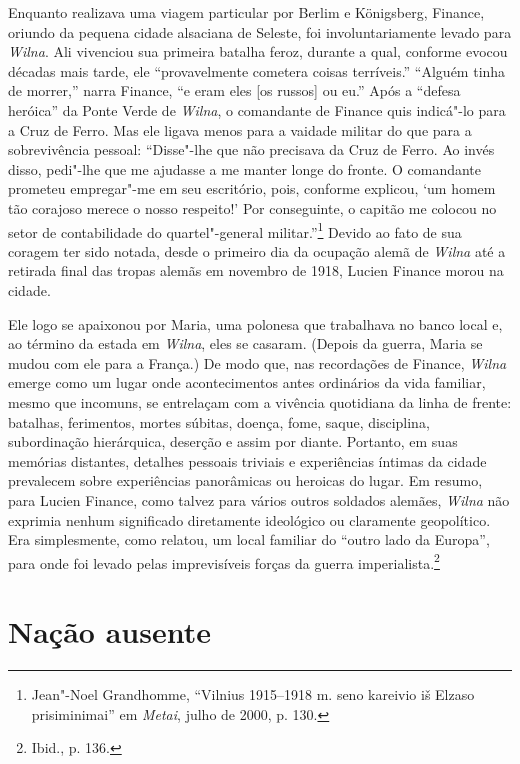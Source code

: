 Enquanto realizava uma viagem particular por Berlim e Königsberg,
Finance, oriundo da pequena cidade alsaciana de Seleste, foi
involuntariamente levado para \textit{Wilna}. Ali vivenciou sua primeira batalha
feroz, durante a qual, conforme evocou décadas mais tarde, ele
``provavelmente cometera coisas terríveis.'' ``Alguém tinha de morrer,''
narra Finance, ``e eram eles {[}os russos{]} ou eu.'' Após a ``defesa
heróica'' da Ponte Verde de \textit{Wilna}, o comandante de Finance quis
indicá"-lo para a Cruz de Ferro. Mas ele ligava menos para a vaidade
militar do que para a sobrevivência pessoal: ``Disse"-lhe que não
precisava da Cruz de Ferro. Ao invés disso, pedi"-lhe que me ajudasse a
me manter longe do fronte. O comandante prometeu empregar"-me em seu
escritório, pois, conforme explicou, `um homem tão corajoso merece o
nosso respeito!' Por conseguinte, o capitão me colocou no setor de
contabilidade do quartel"-general militar.''\footnote{Jean"-Noel Grandhomme, ``Vilnius 1915--1918 m. seno kareivio iš Elzaso prisiminimai'' em \textit{Metai}, julho de 2000, p. 130.} Devido ao fato de sua coragem ter sido notada, desde o primeiro dia da ocupação alemã
de \textit{Wilna} até a retirada final das tropas alemãs em novembro de 1918,
Lucien Finance morou na cidade.

Ele logo se apaixonou por Maria, uma polonesa que trabalhava no banco
local e, ao término da estada em \textit{Wilna}, eles se casaram. (Depois da
guerra, Maria se mudou com ele para a França.) De modo que, nas
recordações de Finance, \textit{Wilna} emerge como um lugar onde acontecimentos
antes ordinários da vida familiar, mesmo que incomuns, se entrelaçam com
a vivência quotidiana da linha de frente: batalhas, ferimentos, mortes
súbitas, doença, fome, saque, disciplina, subordinação hierárquica,
deserção e assim por diante. Portanto, em suas memórias distantes,
detalhes pessoais triviais e experiências íntimas da cidade prevalecem
sobre experiências panorâmicas ou heroicas do lugar. Em resumo, para
Lucien Finance, como talvez para vários outros soldados alemães, \textit{Wilna}
não exprimia nenhum significado diretamente ideológico ou claramente
geopolítico. Era simplesmente, como relatou, um local familiar do
``outro lado da Europa'', para onde foi levado pelas imprevisíveis
forças da guerra imperialista.\footnote{Ibid., p. 136.}

%

\chapter{Nação ausente}

